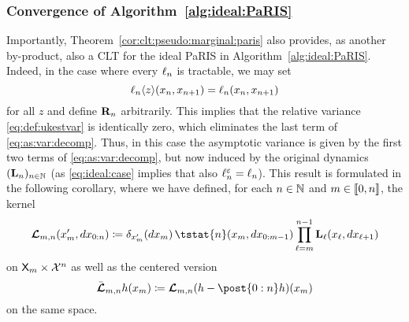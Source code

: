 \subsubsection{Convergence of Algorithm~\ref{alg:ideal:PaRIS}}

Importantly, Theorem~\ref{cor:clt:pseudo:marginal:paris} also provides, as another by-product, also a CLT for the ideal PaRIS in Algorithm~\ref{alg:ideal:PaRIS}. Indeed, in the case where every $\ell_{n}$ is tractable, we may set 
\begin{equation} \label{eq:ideal:case}
\ukest{n}{z}(x_n, x_{n + 1}) = \ud{n}(x_n, x_{n + 1})
\end{equation} 
for all $z$ and define $\mathbf{R}_{n}$ arbitrarily. This implies that the relative variance \eqref{eq:def:ukestvar} is identically zero, which eliminates the last term of \eqref{eq:as:var:decomp}. Thus, in this case the asymptotic variance is given by the first two terms of \eqref{eq:as:var:decomp}, but now induced by the original dynamics $(\mathbf{L}_{n})_{n \in \mathbb{N}}$ (as \eqref{eq:ideal:case} implies that also $\ell^\varepsilon_{n} = \ell_{n}$). This result is formulated in the following corollary, where we have defined, for each $n \in \mathbb{N}$ and $m \in \llbracket 0, n \rrbracket$, the kernel  
\begin{equation} \label{eq:def:retrok}
    \retrok_{m, n}(x_m', \rmd x_{0:n}) \eqdef \delta_{x_m'}(\rmd x_m) \,  
    \tstat{n}(x_m, \rmd x_{0:m - 1})
    \prod_{\ell = m}^{n - 1} \uk{\ell}(x_\ell, \rmd x_{\ell + 1})
\end{equation}
on $\mathsf{X}_m \times \mathcal{X}^n$ as well as the centered version 
$$
\retroknorm_{m, n} h (x_m) \eqdef  \retrok_{m, n}(h - \post{0:n} h)(x_m) 
$$
on the same space. 

